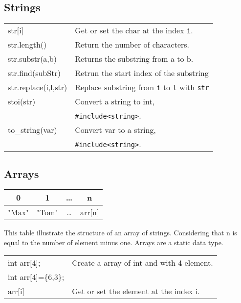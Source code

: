 \documentclass[5pt]{article}
\begin{document}
\begin{multicols}{2}
\subsection{Strings}
\begin{tabular}{>{\ttfamily}l l}
str$[$i$]$          & Get or set the char at the index \texttt{i}.\\
str.length()        & Return the number of characters.\\
str.substr(a,b)     & Returns the substring from a to b.\\
str.find(subStr)    & Retrun the start index of the substring\\
str.replace(i,l,str)& Replace substring from \texttt{i} to \texttt{l} with \texttt{str}\\
stoi(str)           & Convert a string to int,\\
                    & \texttt{\#include<string>}.\\
to\_string(var)     & Convert var to a string,\\
                    & \texttt{\#include<string>}.\\
\end{tabular}

\subsection{Arrays}
\begin{tabular}{c|c|c|c }
 0 & 1 & … & n \\ 
 \hline
 "Max" & "Tom" & … & arr$[$n$]$
\end{tabular}
This table illustrate the structure of an array of strings. Considering that n is equal to the number of element minus one. Arrays are a static data type.\\[6pt]
\begin{tabular}{>{\ttfamily}l l}
int arr[4];         & Create a array of int and with 4 element.\\
int arr[4]=\{6,3\}; & \\
arr$[$i$]$          & Get or set the element at the index i.\\
\end{tabular}



\end{multicols}
\end{document}
